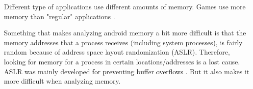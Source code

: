 Different type of applications use different amounts of memory. Games use more memory than "regular" applications \cite{}.

Something that makes analyzing android memory a bit more difficult is that the memory addresses that a process
receives (including system processes), is fairly random because of address space layout randomization (ASLR). Therefore, looking for memory for a process in certain locations/addresses is a lost cause.
ASLR was mainly developed for preventing buffer overflows \cite{prot_aslr}. But it also makes it more difficult when analyzing memory.



%
%

